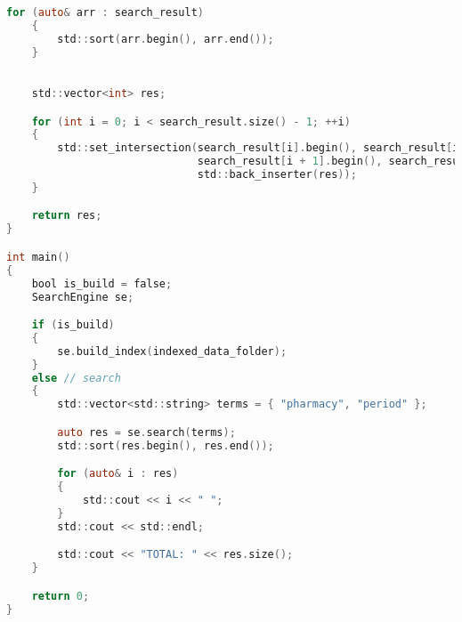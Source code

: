 \begin{lstlisting}[language=C]
	for (auto& arr : search_result)
	{
		std::sort(arr.begin(), arr.end());
	}

	
	std::vector<int> res;

	for (int i = 0; i < search_result.size() - 1; ++i)
	{
		std::set_intersection(search_result[i].begin(), search_result[i].end(), 
							  search_result[i + 1].begin(), search_result[i + 1].end(),
							  std::back_inserter(res));
	}

	return res;
}

int main()
{
	bool is_build = false;
	SearchEngine se;

	if (is_build)
	{
		se.build_index(indexed_data_folder);
	}
	else // search
	{
		std::vector<std::string> terms = { "pharmacy", "period" };

		auto res = se.search(terms);
		std::sort(res.begin(), res.end());

		for (auto& i : res)
		{
			std::cout << i << " ";
		}
		std::cout << std::endl;

		std::cout << "TOTAL: " << res.size();
	}

	return 0;
}

\end{lstlisting}

\pagebreak

